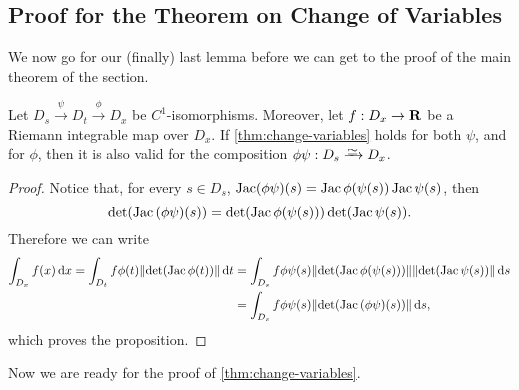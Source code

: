 \subsection{Proof for the Theorem on Change of Variables}
\label{subsub:change-variables-proof}

We now go for our (finally) last lemma before we can get to the proof of the
main theorem of the section.

\begin{lemma}
\label{lem:composition-diffeo-change-variables}
Let \(D_s \xrightarrow{\psi} D_t \xrightarrow{\phi} D_x\) be
\(C^1\)-isomorphisms. Moreover, let \(f: D_x \to \mathbf{R}\) be a Riemann integrable
map over \(D_x\). If \cref{thm:change-variables} holds for both \(\psi\), and
for \(\phi\), then it is also valid for the composition \(\phi \psi: D_s \isoto
D_x\).
\end{lemma}

\begin{proof}
Notice that, for every \(s \in D_s\), \(\operatorname{Jac} (\phi \psi)(s) = \operatorname{Jac}
\phi(\psi(s)) \operatorname{Jac} \psi(s)\), then
\[
  \det(\operatorname{Jac} {(\phi \psi)}(s)) = \det(\operatorname{Jac} \phi(\psi(s))) \det(\operatorname{Jac} \psi(s)).
\]
Therefore we can write
{\small
\begin{align*}
  \int_{D_x} f(x)\, \mathrm{d} x
  = \int_{D_t} f \phi(t) \lVert\det(\operatorname{Jac} \phi(t))\rVert\, \mathrm{d} t
  &= \int_{D_s} f \phi \psi(s) \lVert\det(\operatorname{Jac} \phi(\psi(s)))\rVert
  \lVert\det(\operatorname{Jac} \psi(s))\rVert\, \mathrm{d} s \\
  &= \int_{D_s} f \phi \psi(s) \lVert\det(\operatorname{Jac}{(\phi \psi)}(s))\rVert\, \mathrm{d} s,
\end{align*}
}
which proves the proposition.
\end{proof}

Now we are ready for the proof of \cref{thm:change-variables}.

